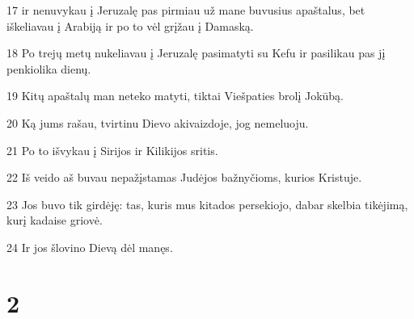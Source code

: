 \par 17 ir nenuvykau į Jeruzalę pas pirmiau už mane buvusius apaštalus, bet iškeliavau į Arabiją ir po to vėl grįžau į Damaską. 
\par 18 Po trejų metų nukeliavau į Jeruzalę pasimatyti su Kefu ir pasilikau pas jį penkiolika dienų. 
\par 19 Kitų apaštalų man neteko matyti, tiktai Viešpaties brolį Jokūbą. 
\par 20 Ką jums rašau, tvirtinu Dievo akivaizdoje, jog nemeluoju. 
\par 21 Po to išvykau į Sirijos ir Kilikijos sritis. 
\par 22 Iš veido aš buvau nepažįstamas Judėjos bažnyčioms, kurios Kristuje. 
\par 23 Jos buvo tik girdėję: tas, kuris mus kitados persekiojo, dabar skelbia tikėjimą, kurį kadaise griovė. 
\par 24 Ir jos šlovino Dievą dėl manęs.


\chapter{2}


